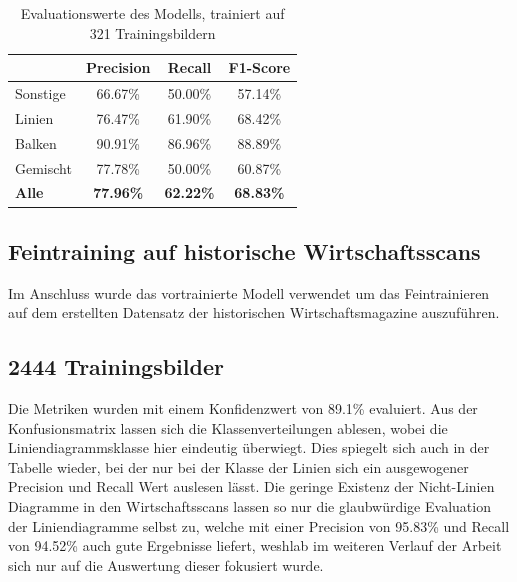 \begin{table}[H]
    \centering
    \begin{tabular}{|l|c|c|c|}
        \hline
        \rowcolor[HTML]{EFEFEF}
                      & Precision        & Recall           & F1-Score         \\ \hline
        Sonstige      & 66.67\%          & 50.00\%          & 57.14\%          \\ \hline
        Linien        & 76.47\%          & 61.90\%          & 68.42\%          \\ \hline
        Balken        & 90.91\%          & 86.96\%          & 88.89\%          \\ \hline
        Gemischt      & 77.78\%          & 50.00\%          & 60.87\%          \\ \hline
        \textbf{Alle} & \textbf{77.96\%} & \textbf{62.22\%} & \textbf{68.83\%} \\ \hline
    \end{tabular}
    \caption{Evaluationswerte des Modells, trainiert auf 321 Trainingsbildern}
\end{table}


\subsection{Feintraining auf historische Wirtschaftsscans}

Im Anschluss wurde das vortrainierte Modell verwendet um das Feintrainieren auf dem erstellten Datensatz der historischen Wirtschaftsmagazine auszuführen.

\subsection*{2444 Trainingsbilder}
Die Metriken wurden mit einem Konfidenzwert von 89.1\% evaluiert. Aus der Konfusionsmatrix lassen sich die Klassenverteilungen ablesen, wobei die Liniendiagrammsklasse hier eindeutig überwiegt. Dies spiegelt sich auch in der Tabelle wieder, bei der nur bei der Klasse der Linien sich ein ausgewogener Precision und Recall Wert auslesen lässt. Die geringe Existenz der Nicht-Linien Diagramme in den Wirtschaftsscans lassen so nur die glaubwürdige Evaluation der Liniendiagramme selbst zu, welche mit einer Precision von 95.83\% und Recall von 94.52\% auch gute Ergebnisse liefert, weshlab im weiteren Verlauf der Arbeit sich nur auf die Auswertung dieser fokusiert wurde.

